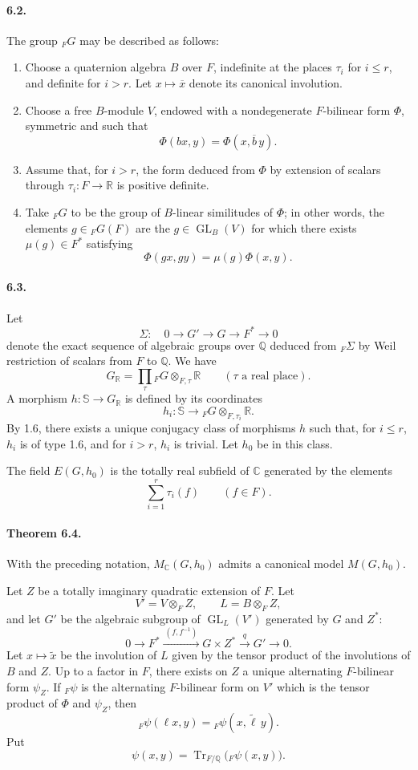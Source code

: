 \documentclass[10pt]{article}
\newcommand{\C}{\mathbb C}
\newcommand{\Q}{\mathbb Q}
\newcommand{\R}{\mathbb R}
\newcommand{\bS}{\mathbb S}
\newcommand{\GL}{\operatorname{GL}}
\newcommand{\MC}{M_{\C}}
\newcommand{\Tr}{\operatorname{Tr}}
\begin{document}
\paragraph{6.2.} The group ${}_FG$ may be described as follows:
\begin{enumerate}[label=(\alph*)]
\item Choose a quaternion algebra $B$ over $F$, indefinite at the places $\tau_i$ for $i\le r$, and definite for $i>r$. Let $x\mapsto\overline{x}$ denote its canonical involution.
\item Choose a free $B$-module $V$, endowed with a nondegenerate $F$-bilinear form $\Phi$, symmetric and such that
\[
\Phi(bx,y)=\Phi(x,\overline b\,y).
\]
\item Assume that, for $i>r$, the form deduced from $\Phi$ by extension of scalars through $\tau_i:F\to\R$ is positive definite.
\item Take ${}_FG$ to be the group of $B$-linear similitudes of $\Phi$; in other words, the elements $g\in{}_FG(F)$ are the $g\in\GL_B(V)$ for which there exists $\mu(g)\in F^*$ satisfying
\[
\Phi(gx,gy)=\mu(g)\Phi(x,y).
\]
\end{enumerate}

\paragraph{6.3.} Let
\[
\Sigma:\quad 0\longrightarrow G'\longrightarrow G\longrightarrow F^*\longrightarrow0
\]
denote the exact sequence of algebraic groups over $\Q$ deduced from ${}_F\Sigma$ by Weil restriction of scalars from $F$ to $\Q$. We have
\[
\tag{6.3.1}
G_{\R}=\prod_{\tau}{}_FG\otimes_{F,\tau}\R
\qquad(\tau\text{ a real place}).
\]
A morphism $h:\bS\to G_\R$ is defined by its coordinates
\[
h_i:\bS\longrightarrow {}_FG\otimes_{F,\tau_i}\R.
\]
By 1.6, there exists a unique conjugacy class of morphisms $h$ such that, for $i\le r$, $h_i$ is of type 1.6, and for $i>r$, $h_i$ is trivial. Let $h_0$ be in this class.

The field $E(G,h_0)$ is the totally real subfield of $\C$ generated by the elements
\[
\sum_{i=1}^r\tau_i(f)\qquad(f\in F).
\]

\paragraph{Theorem 6.4.} With the preceding notation, $\MC(G,h_0)$ admits a canonical model $M(G,h_0)$.

Let $Z$ be a totally imaginary quadratic extension of $F$. Let
\[
V'=V\otimes_F Z,\qquad L=B\otimes_F Z,
\]
and let $G'$ be the algebraic subgroup of $\GL_L(V')$ generated by $G$ and $Z^*$:
\[
\tag{6.4.1}
0\longrightarrow F^*\xrightarrow{\ (f,f^{-1})\ }G\times Z^*
 \xrightarrow{\ q\ }G'\longrightarrow0.
\]
Let $x\mapsto\widetilde x$ be the involution of $L$ given by the tensor product of the involutions of $B$ and $Z$. Up to a factor in $F$, there exists on $Z$ a unique alternating $F$-bilinear form $\psi_Z$. If ${}_F\psi$ is the alternating $F$-bilinear form on $V'$ which is the tensor product of $\Phi$ and $\psi_Z$, then
\[
{}_F\psi(\ell x,y)={}_F\psi(x,\widetilde\ell\,y).
\]
Put
\[
\psi(x,y)=\Tr_{F/\Q}\bigl({}_F\psi(x,y)\bigr).
\]
\end{document}
